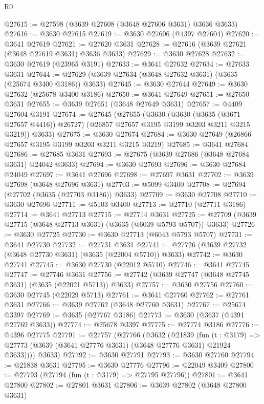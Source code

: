 \begin{lexlean}{R0}
\begin{coremodule}
@27615 := @27598 (@3639 @27608 (@3648 @27606 @3631) @3636 @3633)
@27616 := @3630 @27615
@27619 := @3630 @27606 (@4397 @27604)
@27620 := @3641 @27619
@27621 := @27620 @3631
@27628 := @27616 (@3639 @27621 (@3648 @27619 @3631) @3636 @3633)
@27629 := @3630 @27628
@27632 := @3630 @27619 (@23965 @3191)
@27633 := @3641 @27632
@27634 := @27633 @3631
@27644 := @27629 (@3639 @27634 (@3648 @27632 @3631) (@3635 (@25674 @3400 @3186)) @3633)
@27645 := @3630 @27644
@27649 := @3630 @27632 (@25678 @3400 @3186)
@27650 := @3641 @27649
@27651 := @27650 @3631
@27655 := @3639 @27651 (@3648 @27649 @3631)
@27657 := @4409 @27604 @3191
@27674 := @27645
    (@27655
      (@3630
        (@3630 (@3635 (@3671 @27657 @4416)) @26727)
        (@26857 @27657 @3195 @3199 @3203 @3211 @3215 @3219))
      @3633)
@27675 := @3630 @27674
@27684 := @3630 @27649 (@26866 @27657 @3195 @3199 @3203 @3211 @3215 @3219)
@27685 := @3641 @27684
@27686 := @27685 @3631
@27693 := @27675 (@3639 @27686 (@3648 @27684 @3631) @24042 @3633)
@27694 := @3630 @27693
@27696 := @3630 @27684 @24049
@27697 := @3641 @27696
@27698 := @27697 @3631
@27702 := @3639 @27698 (@3648 @27696 @3631)
@27703 := @5099 @3400
@27708 := @27694 (@27702 (@3635 (@27703 @3186)) @3633)
@27709 := @3630 @27708
@27710 := @3630 @27696
@27711 := @5103 @3400
@27713 := @27710 (@27711 @3186)
@27714 := @3641 @27713
@27715 := @27714 @3631
@27725 := @27709 (@3639 @27715 (@3648 @27713 @3631) (@3635 (@6039 @5793 @5707)) @3633)
@27726 := @3630 @27725
@27730 := @3630 @27713 (@6043 @5793 @5707)
@27731 := @3641 @27730
@27732 := @27731 @3631
@27741 := @27726 (@3639 @27732 (@3648 @27730 @3631) (@3635 (@22004 @5710)) @3633)
@27742 := @3630 @27741
@27745 := @3630 @27730 (@22012 @5710)
@27746 := @3641 @27745
@27747 := @27746 @3631
@27756 := @27742 (@3639 @27747 (@3648 @27745 @3631) (@3635 (@22021 @5713)) @3633)
@27757 := @3630 @27756
@27760 := @3630 @27745 (@22029 @5713)
@27761 := @3641 @27760
@27762 := @27761 @3631
@27766 := @3639 @27762 (@3648 @27760 @3631)
@27767 := @25674 @3397
@27769 := @3635 (@27767 @3186)
@27773 := @3630 (@3637 (@4391 @27769 @3633))
@27774 := @25678 @3397
@27775 := @27774 @3186
@27776 := @4396 @27775
@27791 := @27757
    (@27766
      (@3632
        (@21839
          (fun (t : @3179) =>
          @27773 (@3639 (@3641 @27776 @3631) (@3648 @27776 @3631) @21924 @3633))))
      @3633)
@27792 := @3630 @27791
@27793 := @3630 @27760
@27794 := @21838 @3631
@27795 := @3630 @27776
@27796 := @22049 @3409
@27800 := @27793 (@27794 (fun (t : @3179) => @27795 @27796))
@27801 := @3641 @27800
@27802 := @27801 @3631
@27806 := @3639 @27802 (@3648 @27800 @3631)

\end{coremodule}
\end{lexlean}
